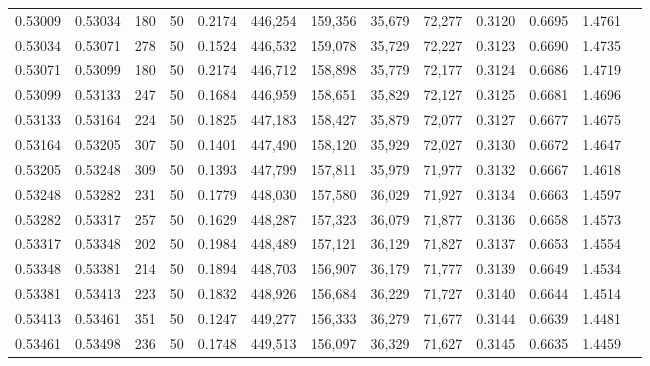 \begin{tabular}{rrrrrrrrrrrrr}
0.53009 & 0.53034 &   180 &  50 &                                     0.2174 & 446,254 & 159,356 &  35,679 &  72,277 & 0.3120 & 0.6695 & 1.4761 \\
0.53034 & 0.53071 &   278 &  50 &                                     0.1524 & 446,532 & 159,078 &  35,729 &  72,227 & 0.3123 & 0.6690 & 1.4735 \\
0.53071 & 0.53099 &   180 &  50 &                                     0.2174 & 446,712 & 158,898 &  35,779 &  72,177 & 0.3124 & 0.6686 & 1.4719 \\
0.53099 & 0.53133 &   247 &  50 &                                     0.1684 & 446,959 & 158,651 &  35,829 &  72,127 & 0.3125 & 0.6681 & 1.4696 \\
0.53133 & 0.53164 &   224 &  50 &                                     0.1825 & 447,183 & 158,427 &  35,879 &  72,077 & 0.3127 & 0.6677 & 1.4675 \\
0.53164 & 0.53205 &   307 &  50 &                                     0.1401 & 447,490 & 158,120 &  35,929 &  72,027 & 0.3130 & 0.6672 & 1.4647 \\
0.53205 & 0.53248 &   309 &  50 &                                     0.1393 & 447,799 & 157,811 &  35,979 &  71,977 & 0.3132 & 0.6667 & 1.4618 \\
0.53248 & 0.53282 &   231 &  50 &                                     0.1779 & 448,030 & 157,580 &  36,029 &  71,927 & 0.3134 & 0.6663 & 1.4597 \\
0.53282 & 0.53317 &   257 &  50 &                                     0.1629 & 448,287 & 157,323 &  36,079 &  71,877 & 0.3136 & 0.6658 & 1.4573 \\
0.53317 & 0.53348 &   202 &  50 &                                     0.1984 & 448,489 & 157,121 &  36,129 &  71,827 & 0.3137 & 0.6653 & 1.4554 \\
0.53348 & 0.53381 &   214 &  50 &                                     0.1894 & 448,703 & 156,907 &  36,179 &  71,777 & 0.3139 & 0.6649 & 1.4534 \\
0.53381 & 0.53413 &   223 &  50 &                                     0.1832 & 448,926 & 156,684 &  36,229 &  71,727 & 0.3140 & 0.6644 & 1.4514 \\
0.53413 & 0.53461 &   351 &  50 &                                     0.1247 & 449,277 & 156,333 &  36,279 &  71,677 & 0.3144 & 0.6639 & 1.4481 \\
0.53461 & 0.53498 &   236 &  50 &                                     0.1748 & 449,513 & 156,097 &  36,329 &  71,627 & 0.3145 & 0.6635 & 1.4459 \\

\end{tabular}
